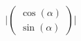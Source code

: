 \documentclass[preview]{standalone}
\begin{document}
\begin{align*}
\lvert \begin{pmatrix} \cos(\alpha) \\ \sin(\alpha) \end{pmatrix} \vert
\end{align*}
\end{document}

